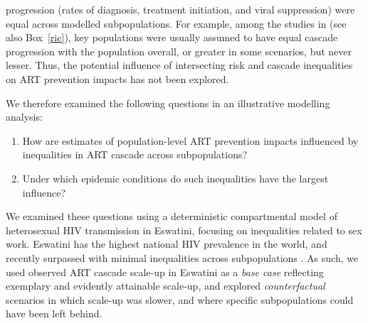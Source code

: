 progression (\ie rates of diagnosis, treatment initiation, and viral suppression)
were equal across modelled subpopulations.
For example, among the studies in \cite{Knight2022sr} (see also Box~\ref{ric}),
key populations were usually assumed to have
equal cascade progression with the population overall,
or greater in some scenarios, but never lesser.
Thus, the potential influence of intersecting risk and cascade inequalities
on ART prevention impacts has not been explored.
\par
We therefore examined the following questions in an illustrative modelling analysis:
\begin{enumerate}
  \item\label{obj:art.1} How are estimates of population-level ART prevention impacts
    influenced by inequalities in ART cascade across subpopulations?
  \item\label{obj:art.2} Under which epidemic conditions
    do such inequalities have the largest influence?
\end{enumerate}
We examined these questions using
a deterministic compartmental model of heterosexual HIV transmission in Eswatini,
focusing on inequalities related to sex work.
Eswatini has the highest national HIV prevalence in the world,
and recently surpassed \cashi with minimal inequalities across subpopulations
\cite{SHIMS3,UNAIDS2023}.
As such, we used observed ART cascade scale-up in Eswatini as a \emph{base case}
reflecting exemplary and evidently attainable scale-up,
and explored \emph{counterfactual} scenarios in which scale-up was slower,
and where specific subpopulations could have been left behind.
